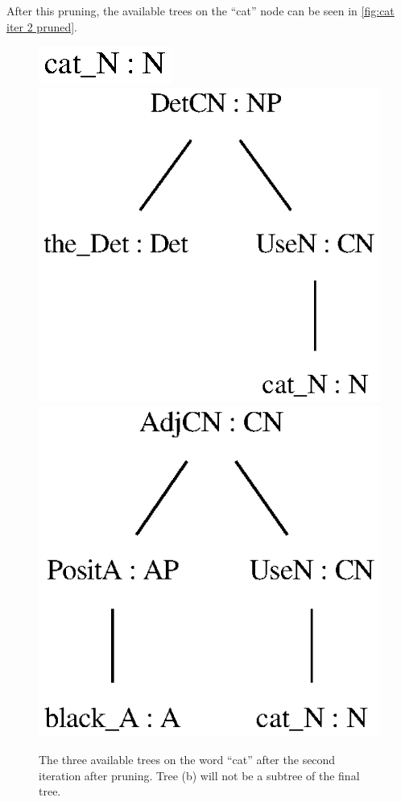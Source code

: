 After this pruning, the available trees on the ``cat'' node can be seen in  \autoref{fig:cat iter 2 pruned}.
\begin{figure}[H]
    \centering
        {\includegraphics[scale=0.7]{thesis/figure/black_cats/cat_N_gf.eps}}
        {\includegraphics[scale=0.7]{thesis/figure/black_cats/the_cat_NP_gf.eps}}
        {\includegraphics[scale=0.7]{thesis/figure/black_cats/black_cat_CN_gf.eps}}
    \caption{The three available trees on the word ``cat'' after the second iteration after pruning. Tree (b) will not be a subtree of the final tree.}\label{fig:cat iter 2 pruned}
\end{figure}
